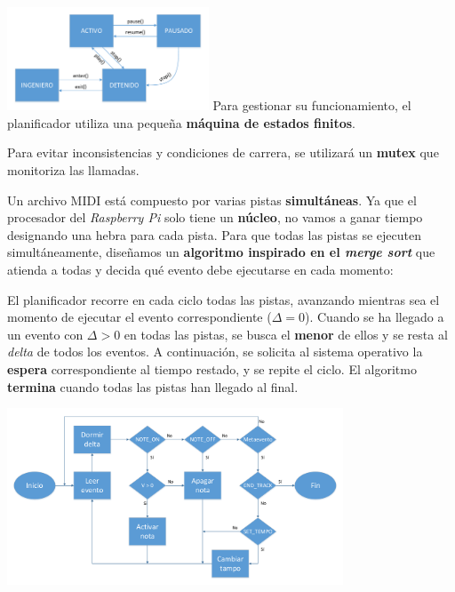 \documentclass[10pt,a4paper]{article}
\begin{document}
	\begin{multicols}{2}
		\noindent
		\includegraphics[width=0.45\textwidth]{images/estados} 
		\columnbreak
		Para gestionar su funcionamiento, el planificador utiliza una pequeña \textbf{máquina de estados finitos}.
		
		Para evitar inconsistencias y condiciones de carrera, se utilizará un \textbf{mutex} que monitoriza las llamadas.
	\end{multicols}
	
	Un archivo MIDI está compuesto por varias pistas \textbf{simultáneas}. Ya que el procesador del \textit{Raspberry Pi} solo tiene un \textbf{núcleo}, no vamos a ganar tiempo designando una hebra para cada pista. Para que todas las pistas se ejecuten simultáneamente, diseñamos un \textbf{algoritmo inspirado en el \textit{merge sort}} que atienda a todas y decida qué evento debe ejecutarse en cada momento:
	
	El planificador recorre en cada ciclo todas las pistas, avanzando mientras sea el momento de ejecutar el evento correspondiente ($\Delta=0$). Cuando se ha llegado a un evento con $\Delta > 0$ en todas las pistas, se busca el \textbf{menor} de ellos y se resta al \textit{delta} de todos los eventos. A continuación, se solicita al sistema operativo la \textbf{espera} correspondiente al tiempo restado, y se repite el ciclo. El algoritmo \textbf{termina} cuando todas las pistas han llegado al final.
	
	\begin{center}
		\includegraphics[width=0.75\textwidth]{images/flujo_planificacion} 
	\end{center}
	
\end{document}
